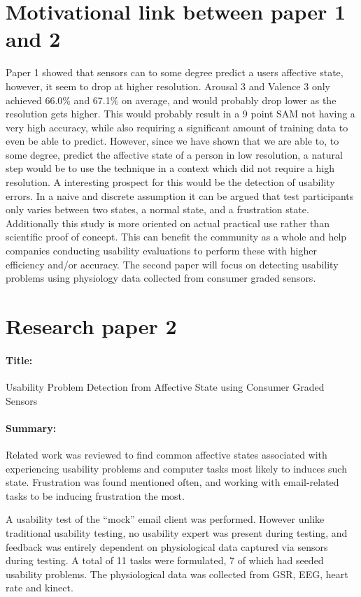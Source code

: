 \section{Motivational link between paper 1 and 2}
Paper 1 showed that sensors can to some degree predict a users affective state, however, it seem to drop at higher resolution. 
Arousal 3 and Valence 3 only achieved 66.0\% and 67.1\% on average, and would probably drop lower as the resolution gets higher. 
This would probably result in a 9 point SAM not having a very high accuracy, while also requiring a significant amount of training data to even be able to predict.
However, since we have shown that we are able to, to some degree, predict the affective state of a person in low resolution, a natural step would be to use the technique in a context which did not require a high resolution. 
A interesting prospect for this would be the detection of usability errors.
In a naive and discrete assumption it can be argued that test participants only varies between two states, a normal state, and a frustration state.
Additionally this study is more oriented on actual practical use rather than scientific proof of concept. 
This can benefit the community as a whole and help companies conducting usability evaluations to perform these with higher efficiency and/or accuracy.
The second paper will focus on detecting usability problems using physiology data collected from consumer graded sensors.

\section{Research paper 2}
\paragraph{Title:}
Usability Problem Detection from Affective State using Consumer Graded Sensors
\paragraph{Summary:}


 Related work was
reviewed to find common affective states associated with experiencing usability problems and computer tasks most likely
to induces such state. Frustration was found mentioned often, and working with email-related tasks to be inducing
frustration the most.



A usability test of the ``mock'' email client was performed. However unlike traditional usability testing, no usability
expert was present during testing, and feedback was entirely dependent on physiological data captured via sensors during
testing.  A total of 11 tasks were formulated, 7 of which had seeded usability problems.  The physiological data
was collected from GSR, EEG, heart rate and kinect.  

